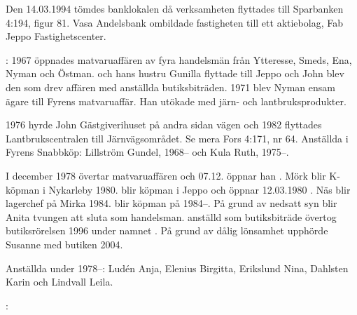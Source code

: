 Den 14.03.1994 tömdes banklokalen då verksamheten flyttades till Sparbanken 4:194, figur 81. Vasa Andelsbank ombildade fastigheten till ett aktiebolag, Fab Jeppo	Fastighetscenter.


:
1967 öppnades matvaruaffären  av fyra handelsmän från Ytteresse, Smeds, Ena, Nyman och Östman.  och hans hustru Gunilla flyttade till Jeppo och John blev den som drev affären med anställda butiksbiträden. 1971 blev Nyman ensam ägare till Fyrens matvaruaffär. Han utökade med järn- och lantbruksprodukter.

1976 hyrde John Gästgiverihuset på andra sidan vägen och 1982 flyttades Lantbrukscentralen till Järnvägsområdet. Se mera Fors 4:171, nr 64.	Anställda i Fyrens Snabbköp:	Lillström Gundel,	1968--	och	Kula Ruth, 1975--.

I december 1978 övertar  matvaruaffären och 07.12. öppnar han . Mörk blir K-köpman i Nykarleby 1980.  blir köpman i Jeppo och öppnar 12.03.1980 . Näs blir lagerchef på Mirka 1984.  blir köpman på 	 1984--. På grund av nedsatt syn blir Anita tvungen att sluta	som handelsman.  anställd som butiksbiträde övertog	butiksrörelsen 1996 under namnet . På grund av dålig lönsamhet upphörde Susanne med butiken 2004.

Anställda under 1978--: Ludén Anja, Elenius Birgitta, Erikslund Nina, Dahlsten Karin och Lindvall Leila.


:


